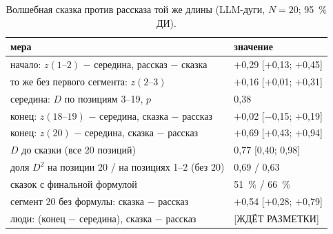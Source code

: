 \begin{table}[t]
\centering\small
\caption{Волшебная сказка против рассказа той же длины (LLM-дуги, $N = 20$; 95~\% ДИ).}
\label{tab:frame}
\begin{tabular}{ll}
\toprule
мера & значение \\
\midrule
начало: $z(1\text{--}2)$ $-$ середина, рассказ $-$ сказка & $+$0,29 [$+$0,13; $+$0,45] \\
то же без первого сегмента: $z(2\text{--}3)$ & $+$0,16 [$+$0,01; $+$0,31] \\
середина: $D$ по позициям 3--19, $p$ & 0,38 \\
конец: $z(18\text{--}19)$ $-$ середина, сказка $-$ рассказ & $+$0,02 [$-$0,15; $+$0,19] \\
конец: $z(20)$ $-$ середина, сказка $-$ рассказ & $+$0,69 [$+$0,43; $+$0,94] \\
$D$ до сказки (все 20 позиций) & 0,77 [0,40; 0,98] \\
доля $D^2$ на позиции 20 / на позициях 1--2 (без 20) & 0,69 / 0,63 \\
сказок с финальной формулой & 51~\% / 66~\% \\
сегмент 20 без формулы: сказка $-$ рассказ & $+$0,54 [$+$0,28; $+$0,79] \\
люди: (конец $-$ середина), сказка $-$ рассказ & [ЖДЁТ РАЗМЕТКИ] \\
\bottomrule
\end{tabular}
\end{table}
